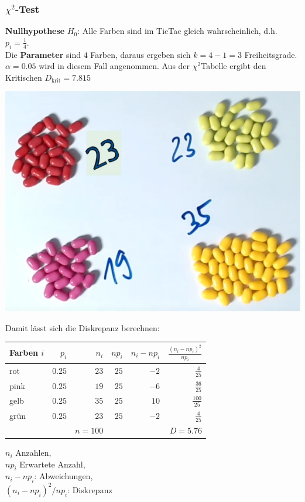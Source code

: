 \subsubsection{$\chi^2$-Test}\label{tictac}
\textbf{Nullhypothese} $H_0$: Alle Farben sind im TicTac gleich wahrscheinlich, d.h. $p_i = \frac{1}{4}$.\\
Die \textbf{Parameter} sind $4$ Farben, daraus ergeben sich $k= 4 -1 = 3$ Freiheitsgrade. $\alpha = 0.05$ wird in diesem Fall angenommen. Aus der $\chi^2$Tabelle ergibt den Kritischen $D_\text{krit} = 7.815$
\begin{center}
	\includegraphics[width=0.8\columnwidth]{Images/tictac}
\end{center}

Damit lässt sich die Diskrepanz berechnen:\\
\begin{center}
	\begin{tabular}{l|rrrrr|}
	Farben $i$ & $p_i$ & $n_i$ & $np_i$ & $n_i - np_i$ & $\frac{(n_i - np_i)^2}{np_i}$ \\ \toprule
	rot & $0.25$ & $23$ & $25$ & $-2$ & $\frac{4}{25}$ \\  \midrule
	pink & $0.25$ & $19$ & $25$ & $-6$ & $\frac{36}{25}$ \\ \midrule
	gelb & $0.25$ & $35$ & $25$ & $10$ & $\frac{100}{25}$ \\ \midrule
	grün & $0.25$ & $23$ & $25$ & $-2$ & $\frac{4}{25}$ \\ \midrule
	& & $n=100$ & & & $D =5.76$ \\ \bottomrule
\end{tabular}
\end{center}

\noindent
$n_i$ Anzahlen, \\
$np_i$ Erwartete Anzahl,  \\
$n_i - np_i$: Abweichungen, \\
$(n_i - np_i)^2/np_i$: Diskrepanz

